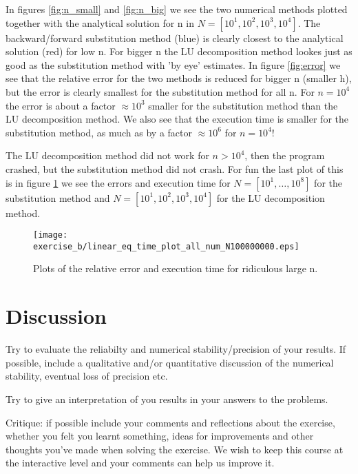 \documentclass[11pt,a4wide]{article}
\begin{document}
In figures \ref{fig:n_small} and \ref{fig:n_big} we see the two numerical methods plotted together with the analytical solution for n in $N = [10^1, 10^2, 10^3, 10^4]$. The backward/forward substitution method (blue) is clearly closest to the analytical solution (red) for low n. For bigger n the LU decomposition method lookes just as good as the substitution method with 'by eye' estimates. In figure \ref{fig:error} we see that the relative error for the two methods is reduced for bigger n (smaller h), but the error is clearly smallest for the substitution method for all n. For $n=10^4$ the error is about a factor $\approx10^3$ smaller for the substitution method than the LU decomposition method. We also see that the execution time is smaller for the substitution method, as much as by a factor $\approx10^6$ for $n=10^4$!

The LU decomposition method did not work for $n>10^4$, then the program crashed, but the substitution method did not crash. For fun the last plot of this is in figure \ref{fig:tull} we see the errors and execution time for $N = [10^1, \dots, 10^8]$ for the substitution method and $N = [10^1, 10^2, 10^3, 10^4]$ for the LU decomposition method. 

\begin{figure}[htp]
\caption{Plots of the relative error and execution time for ridiculous large n.}
\centering
\texttt{[image: exercise\_b/linear\_eq\_time\_plot\_all\_num\_N100000000.eps]}
\label{fig:tull}
\end{figure}


\section{Discussion}


Try to evaluate the reliabilty and numerical stability/precision
of your results. If possible, include a qualitative and/or quantitative
discussion of the numerical stability, eventual loss of precision etc. 

Try to give an interpretation of you results in your answers to 
the problems.

Critique: if possible include your comments and reflections about the 
exercise, whether you felt you learnt something, ideas for improvements and 
other thoughts you've made when solving the exercise.
We wish to keep this course at the interactive level and your comments can help
us improve it.
\end{document}

